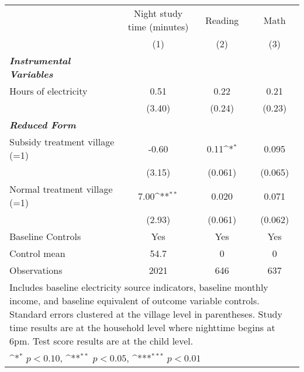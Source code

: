 
\def\sym#1{\ifmmode^{#1}\else\(^{#1}\)\fi}
\begin{adjustbox}{max
width={.85\textwidth},caption={Child level test scores (standardized)},nofloat=table}
\begin{tabular}{l*{3}{c}}
\toprule
&\shortstack{Night study \\ time (minutes)}& Reading & Math \\
& (1) & (2) & (3) \\ \hline
\textbf{\emph{Instrumental Variables}}&                  &                  \\
Hours of electricity   &     0.51  &     0.22         &     0.21         \\
             &   (3.40)   &   (0.24)         &   (0.23)         \\


\textbf{\emph{Reduced Form}}&                  &                  \\
Subsidy treatment village (=1)  &    -0.60 &     0.11\sym{*}  &    0.095         \\
             &   (3.15)    &  (0.061)         &  (0.065)         \\
Normal treatment village (=1)   &     7.00\sym{**} &    0.020         &    0.071         \\
             &   (2.93)    &  (0.061)         &  (0.062)         \\
                \addlinespace
Baseline Controls & Yes &      Yes         &      Yes         \\

Control mean        &     54.7    &        0         &        0         \\
Observations   &     2021  &      646         &      637         \\
\bottomrule
\multicolumn{4}{p{\textwidth}}{\footnotesize Includes baseline electricity source indicators, baseline monthly income, and baseline equivalent of outcome variable controls. Standard errors clustered at the village level in parentheses. Study time results are at the household level where nighttime begins at 6pm. Test score results are at the child level.}\\
\multicolumn{4}{p{\textwidth}}{\footnotesize \sym{*} \(p<0.10\), \sym{**} \(p<0.05\), \sym{***} \(p<0.01\)}\\
\end{tabular}\end{adjustbox}

